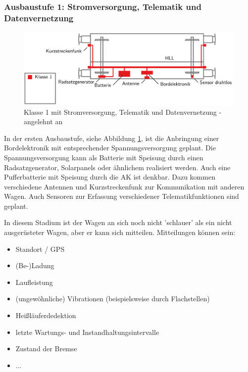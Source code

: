 \subsubsection{Ausbaustufe 1: Stromversorgung, Telematik und Datenvernetzung}
\begin{figure}[hbp] 
    \includegraphics[width=\textwidth]{Bilder/Ausbaustufen_1.PNG}
    \caption{Klasse 1 mit Stromversorgung, Telematik und Datenvernetzung - angelehnt an \cite{ETR_3} }
    \label{fig:Klasse1}
\end{figure} 
In der ersten Ausbaustufe, siehe Abbildung \ref{fig:Klasse1}, ist die Anbringung einer Bordelektronik mit  entsprechender Spannungsversorgung geplant. Die Spannungsversorgung kann als Batterie mit Speisung durch einen Radsatzgenerator, Solarpanels oder ähnlichem realisiert werden. Auch eine Pufferbatterie mit Speisung durch die AK ist denkbar. Dazu kommen verschiedene Antennen und Kurzstreckenfunk zur Kommunikation mit anderen Wagen. Auch Sensoren zur Erfassung verschiedener Telematikfunktionen sind geplant.\par
In diesem Stadium ist der Wagen an sich noch nicht 'schlauer' als ein nicht ausgerüsteter Wagen, aber er kann sich mitteilen. Mitteilungen können sein: 
\begin{itemize}
    \item Standort / GPS
    \item (Be-)Ladung
    \item Laufleistung
    \item (ungewöhnliche) Vibrationen (beispielsweise durch Flachstellen)
    \item Heißläuferdedektion
    \item letzte Wartungs- und Instandhaltungsintervalle
    \item Zustand der Bremse
    \item ...
\end{itemize}
